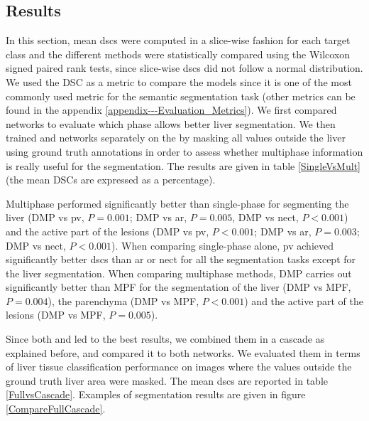 

\subsection{Results}

In this section, mean \ac{dsc}s were computed in a slice-wise fashion for each target class and the different methods were statistically compared using the Wilcoxon 
signed paired rank tests, since slice-wise \ac{dsc}s did not follow a normal distribution. We used the DSC as a metric to compare the models since it is one of the most commonly used metric for the semantic segmentation task (other metrics can be found in the appendix \ref{appendix---Evaluation_Metrics}).
We first compared  networks
 to evaluate which phase allows better liver segmentation. 
 We then trained  and   networks separately on the \textbf{} by masking all values outside the liver using ground truth annotations in order to assess whether multiphase information is really useful for the segmentation. The results are given in table \ref{SingleVsMult} (the mean DSCs are expressed as a percentage).

Multiphase performed significantly better than single-phase for segmenting the liver (DMP vs \ac{pv}, $P=0.001$; DMP vs \ac{ar}, $P=0.005$, DMP vs \ac{nect}, $P<0.001$) and the active part of the lesions (DMP vs \ac{pv}, $P<0.001$; DMP vs \ac{ar}, $P=0.003$; DMP vs \ac{nect}, $P<0.001$). When comparing single-phase alone, \ac{pv} achieved significantly better \ac{dsc}s than \ac{ar} or \ac{nect} for all the segmentation tasks except for the liver segmentation. When comparing multiphase methods, DMP carries out significantly better than MPF for the segmentation of the liver (DMP vs MPF, $P=0.004$), the parenchyma (DMP vs MPF, $P<0.001$) and the active part of the lesions (DMP vs MPF, $P=0.005$).

Since both  and  led to the best results, we combined them in a cascade as explained before, and compared it to both  networks. We evaluated them in terms of liver tissue classification performance on images where the values outside the ground truth liver area were masked. The mean \ac{dsc}s are reported in table \ref{FullvsCascade}. Examples of segmentation results are given in figure \ref{CompareFullCascade}. \\

